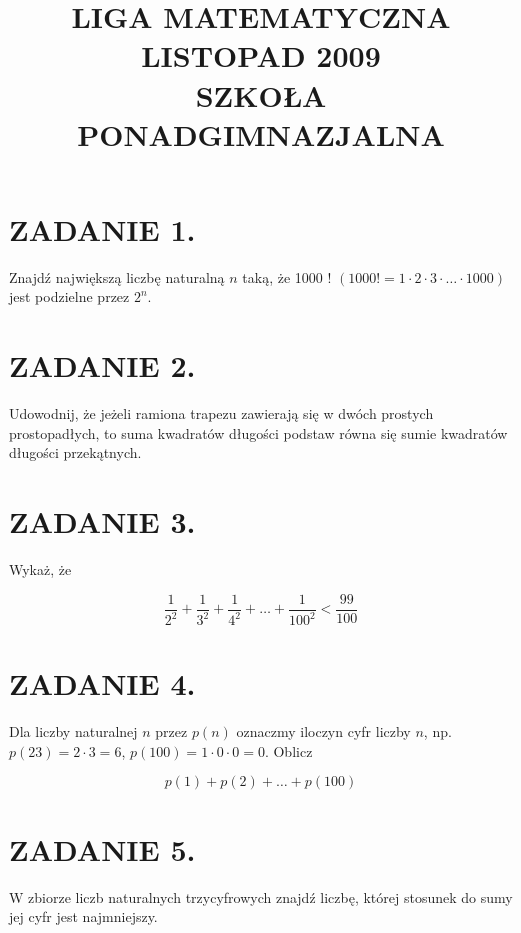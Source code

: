 \documentclass[10pt]{article}
\title{LIGA MATEMATYCZNA \\
 LISTOPAD 2009 \\
 SZKOŁA PONADGIMNAZJALNA }
\author{}
\date{}
\begin{document}
\maketitle
\section*{ZADANIE 1.}
Znajdź największą liczbę naturalną \(n\) taką, że 1000 ! \((1000!=1 \cdot 2 \cdot 3 \cdot \ldots \cdot 1000)\) jest podzielne przez \(2^{n}\).

\section*{ZADANIE 2.}
Udowodnij, że jeżeli ramiona trapezu zawierają się w dwóch prostych prostopadłych, to suma kwadratów długości podstaw równa się sumie kwadratów długości przekątnych.

\section*{ZADANIE 3.}
Wykaż, że

\[
\frac{1}{2^{2}}+\frac{1}{3^{2}}+\frac{1}{4^{2}}+\ldots+\frac{1}{100^{2}}<\frac{99}{100}
\]

\section*{ZADANIE 4.}
Dla liczby naturalnej \(n\) przez \(p(n)\) oznaczmy iloczyn cyfr liczby \(n\), np. \(p(23)=2 \cdot 3=6\), \(p(100)=1 \cdot 0 \cdot 0=0\). Oblicz

\[
p(1)+p(2)+\ldots+p(100)
\]

\section*{ZADANIE 5.}
W zbiorze liczb naturalnych trzycyfrowych znajdź liczbę, której stosunek do sumy jej cyfr jest najmniejszy.
\end{document}
